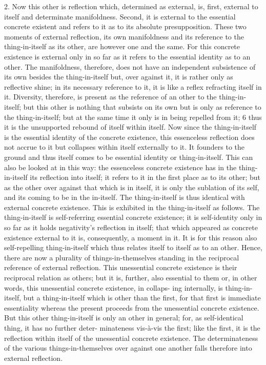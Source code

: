 2. Now this other is reflection which, determined as external, is, first,
external to itself and determinate manifoldness. Second, it is external to the
essential concrete existent and refers to it as to its absolute presupposition.
These two moments of external reflection, its own manifoldness and its
reference to the thing-in-itself as its other, are however one and the same.
For this concrete existence is external only in so far as it refers to the
essential identity as to an other. The manifoldness, therefore, does not have
an independent subsistence of its own besides the thing-in-itself but, over
against it, it is rather only as reflective shine; in its necessary reference to it,
it is like a reflex refracting itself in it. Diversity, therefore, is present as the
reference of an other to the thing-in-itself; but this other is nothing that
subsists on its own but is only as reference to the thing-in-itself; but at the
same time it only is in being repelled from it; 6 thus it is the unsupported
rebound of itself within itself.
Now since the thing-in-itself is the essential identity of the concrete
existence, this essenceless reflection does not accrue to it but collapses
within itself externally to it. It founders to the ground and thus itself
comes to be essential identity or thing-in-itself.
This can also be looked
at in this way: the essenceless concrete existence has in the thing-in-itself its
reflection into itself; it refers to it in the first place as to its other; but as the
other over against that which is in itself, it is only the sublation of its self,
and its coming to be in the in-itself. The thing-in-itself is thus identical
with external concrete existence.
This is exhibited in the thing-in-itself as follows. The thing-in-itself is
self-referring essential concrete existence; it is self-identity only in so far
as it holds negativity's reflection in itself; that which appeared as concrete
existence external to it is, consequently, a moment in it. It is for this reason
also self-repelling thing-in-itself which thus relates itself to itself as to an
other. Hence, there are now a plurality of things-in-themselves standing
in the reciprocal reference of external reflection. This unessential concrete
existence is their reciprocal relation as others; but it is, further, also essential
to them
or, in other words, this unessential concrete existence, in collaps-
ing internally, is thing-in-itself, but a thing-in-itself which is other than the
first, for that first is immediate essentiality whereas the present proceeds
from the unessential concrete existence. But this other thing-in-itself is
only an other in general; for, as self-identical thing, it has no further deter-
minateness vis-à-vis the first; like the first, it is the reflection within itself
of the unessential concrete existence. The determinateness of the various
things-in-themselves over against one another falls therefore into external
reflection.


